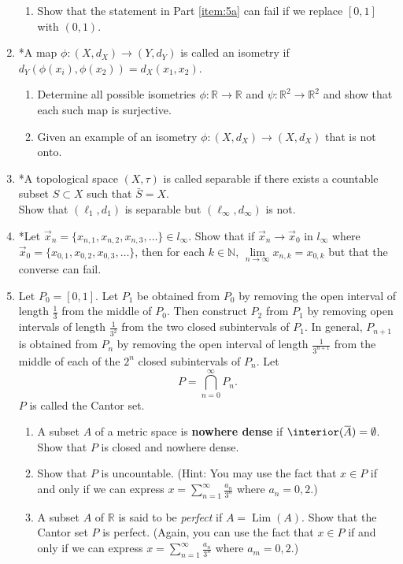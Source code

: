 \documentclass[notoc,notitlepage]{tufte-book}
\DeclareMathOperator{\Lim}{Lim }
\begin{document}
\begin{enumerate}
\begin{enumerate}
      \item Show that the statement in Part \ref{item:5a} can fail if we replace $[0, 1]$ with $(0, 1)$.
    \end{enumerate}

  \item *A map $\phi : (X, d_X) \to (Y, d_Y)$ is called an isometry if $d_Y(\phi(x_i), \phi(x_2)) = d_X(x_1, x_2)$.
    \begin{enumerate}
      \item Determine all possible isometries $\phi : \mathbb{R} \to \mathbb{R}$ and $\psi : \mathbb{R}^2 \to \mathbb{R}^2$ and show that each such map is surjective.
      \item Given an example of an isometry $\phi : (X, d_X) \to (X, d_X)$ that is not onto.
    \end{enumerate}

  \item *A topological space $(X, \tau)$ is called separable if there exists a countable subset $S \subset X$ such that $\bar{S} = X$. \\
    Show that $(\ell_1, d_1)$ is separable but $(\ell_\infty, d_\infty)$ is not.

  \item *Let $\vec{x}_n = \{ x_{n, 1}, x_{n, 2}, x_{n, 3}, \ldots \} \in l_\infty$. Show that if $\vec{x}_n \to \vec{x}_0$ in $l_\infty$ where $\vec{x}_0 = \{ x_{0, 1}, x_{0, 2}, x_{0, 3}, \ldots \}$, then for each $k \in \mathbb{N}$, $\lim\limits_{n \to \infty} x_{n, k} = x_{0, k}$ but that the converse can fail.

  \item Let $P_0 = [0, 1]$. Let $P_1$ be obtained from $P_0$ by removing the open interval of length $\frac{1}{3}$ from the middle of $P_0$. Then construct $P_2$ from $P_1$ by removing open intervals of length $\frac{1}{3^2}$ from the two closed subintervals of $P_1$. In general, $P_{n + 1}$ is obtained from $P_n$ by removing the open interval of length $\frac{1}{3^{n + 1}}$ from the middle of each of the $2^n$ closed subintervals of $P_n$. Let
    \begin{equation*}
      P = \bigcap_{n = 0}^{\infty} P_n.
    \end{equation*}
    $P$ is called the Cantor set.
    \begin{enumerate}
      \item A subset $A$ of a metric space is \textbf{nowhere dense} if $\interior(\bar{A}) = \emptyset$. Show that $P$ is closed and nowhere dense.
      \item Show that $P$ is uncountable. (Hint: You may use the fact that $x \in P$ if and only if we can express $x = \sum\limits_{n=1}^{\infty} \frac{a_n}{3^n}$ where $a_n = 0, 2$.)
      \item A subset $A$ of $\mathbb{R}$ is said to be \textit{perfect} if $A = \Lim(A)$. Show that the Cantor set $P$ is perfect. (Again, you can use the fact that $x \in P$ if and only if we can express $x = \sum\limits_{n=1}^{\infty} \frac{a_n}{3^n}$ where $a_m = 0, 2$.)
    \end{enumerate}
\end{enumerate}
\end{document}
